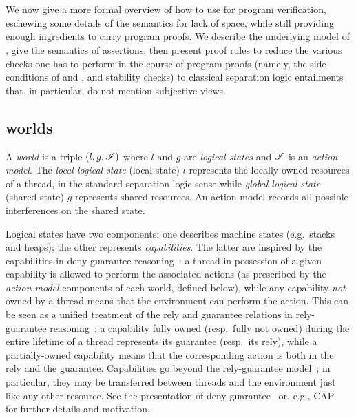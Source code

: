 \section{\colosl}\label{sec:colosl}
We now give a more formal overview of how to use \colosl for program
verification, eschewing some details of the semantics for lack of space,
while still providing enough ingredients to carry program proofs. We
describe the underlying model of \colosl, give the semantics of
\colosl assertions, then present proof rules to reduce the various
checks one has to perform in the course of \colosl program proofs
(namely, the side-conditions of \shiftRule and \extendRule, and
stability checks) to classical separation logic entailments that, in
particular, do not mention subjective views.


\subsection{\colosl worlds}
\label{sec:model}

A \emph{world} is a triple $(l, g, \mathscr{I})$ where $l$ and $g$ are
\emph{logical states} and $\mathscr{I}$ is an \emph{action model}. The
\emph{local logical state} (local state) $l$ represents the
locally owned resources of a thread, in the standard separation logic
sense while \emph{global logical state} (shared state)
$g$ represents shared resources. An action model records all possible interferences on the shared state.

Logical states have two components: one describes machine states
(e.g.\ stacks and heaps); the other represents
\emph{capabilities}. The latter are inspired by the capabilities in
deny-guarantee reasoning~\cite{dg}: a thread in possession of a given
capability is allowed to perform the associated actions (as prescribed
by the \emph{action model} components of each world, defined below),
while any capability \emph{not} owned by a thread means that the
environment can perform the action. This can be seen as a unified
treatment of the rely and guarantee relations in rely-guarantee
reasoning~\cite{rg}: a capability fully owned (resp.\ fully not owned)
during the entire lifetime of a thread represents its guarantee
(resp.\ its rely), while a partially-owned capability means that the
corresponding action is both in the rely and the
guarantee. Capabilities go beyond the rely-guarantee model~\cite{dg};
in particular, they may be transferred between threads and the
environment just like any other resource. See the presentation of
deny-guarantee~\cite{dg} or, e.g., CAP~\cite{cap-ecoop10} for further details
and motivation.

